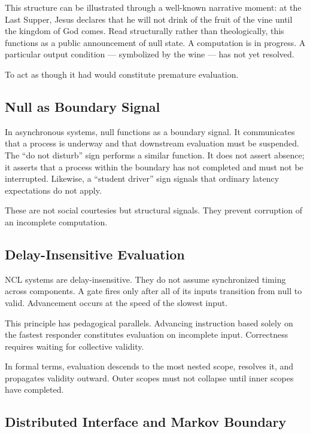 \documentclass[12pt]{article}
\begin{document}
This structure can be illustrated through a well-known narrative moment: at the Last Supper, Jesus declares that he will not drink of the fruit of the vine until the kingdom of God comes. Read structurally rather than theologically, this functions as a public announcement of null state. A computation is in progress. A particular output condition — symbolized by the wine — has not yet resolved.

To act as though it had would constitute premature evaluation.

\subsection*{Null as Boundary Signal}

In asynchronous systems, null functions as a boundary signal. It communicates that a process is underway and that downstream evaluation must be suspended. The ``do not disturb'' sign performs a similar function. It does not assert absence; it asserts that a process within the boundary has not completed and must not be interrupted. Likewise, a ``student driver'' sign signals that ordinary latency expectations do not apply.

These are not social courtesies but structural signals. They prevent corruption of an incomplete computation.

\subsection*{Delay-Insensitive Evaluation}

NCL systems are delay-insensitive. They do not assume synchronized timing across components. A gate fires only after all of its inputs transition from null to valid. Advancement occurs at the speed of the slowest input.

This principle has pedagogical parallels. Advancing instruction based solely on the fastest responder constitutes evaluation on incomplete input. Correctness requires waiting for collective validity.

In formal terms, evaluation descends to the most nested scope, resolves it, and propagates validity outward. Outer scopes must not collapse until inner scopes have completed.

\subsection*{Distributed Interface and Markov Boundary}
\end{document}
